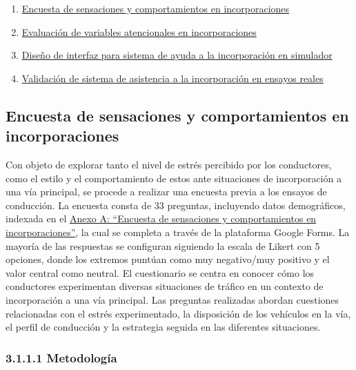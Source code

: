 \begin{enumerate}
    \item \hyperref[311]{Encuesta de sensaciones y comportamientos en incorporaciones}
    \item \hyperref[312]{Evaluación de variables atencionales en incorporaciones}
    \item \hyperref[313]{Diseño de interfaz para sistema de ayuda a la incorporación en simulador}
    \item \hyperref[314]{Validación de sistema de asistencia a la incorporación en ensayos reales} 
\end{enumerate}
\subsection{Encuesta de sensaciones y comportamientos en incorporaciones}\label{311}

Con objeto de explorar tanto el nivel de estrés percibido por los conductores, como el estilo y el comportamiento de estos ante situaciones de incorporación a una vía principal, se procede a realizar una encuesta previa a los ensayos de conducción. La encuesta consta de 33 preguntas, incluyendo datos demográficos, indexada en el \hyperref[AA]{Anexo A: “Encuesta de sensaciones y comportamientos en incorporaciones”}, la cual se completa a través de la plataforma Google Forms. La mayoría de las respuestas se configuran siguiendo la escala de Likert con 5 opciones, donde los extremos puntúan como muy negativo/muy positivo y el valor central como neutral. El cuestionario se centra en conocer cómo los conductores experimentan diversas situaciones de tráfico en un contexto de incorporación a una vía principal. Las preguntas realizadas abordan cuestiones relacionadas con el estrés experimentado, la disposición de los vehículos en la vía, el perfil de conducción y la estrategia seguida en las diferentes situaciones. 

\subsubsection{3.1.1.1 Metodología}\label{3111}

